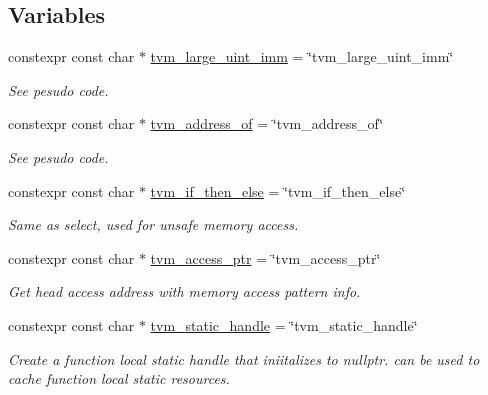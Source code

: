 \subsection*{Variables}
\begin{DoxyCompactItemize}
\item 
constexpr const char $\ast$ \hyperlink{namespacetvm_1_1tir_1_1intrinsic_abdf19f5eab40c9dbc4952e76a29bd49c}{tvm\+\_\+large\+\_\+uint\+\_\+imm} = \char`\"{}tvm\+\_\+large\+\_\+uint\+\_\+imm\char`\"{}
\begin{DoxyCompactList}\small\item\em See pesudo code. \end{DoxyCompactList}\item 
constexpr const char $\ast$ \hyperlink{namespacetvm_1_1tir_1_1intrinsic_a58cdd60cdf71a2b97109804ae5c9c78a}{tvm\+\_\+address\+\_\+of} = \char`\"{}tvm\+\_\+address\+\_\+of\char`\"{}
\begin{DoxyCompactList}\small\item\em See pesudo code. \end{DoxyCompactList}\item 
constexpr const char $\ast$ \hyperlink{namespacetvm_1_1tir_1_1intrinsic_acbd194e010059c3229f6db9809e77e5a}{tvm\+\_\+if\+\_\+then\+\_\+else} = \char`\"{}tvm\+\_\+if\+\_\+then\+\_\+else\char`\"{}
\begin{DoxyCompactList}\small\item\em Same as select, used for unsafe memory access. \end{DoxyCompactList}\item 
constexpr const char $\ast$ \hyperlink{namespacetvm_1_1tir_1_1intrinsic_a9606b4e3a5d65a1ef787969074340be1}{tvm\+\_\+access\+\_\+ptr} = \char`\"{}tvm\+\_\+access\+\_\+ptr\char`\"{}
\begin{DoxyCompactList}\small\item\em Get head access address with memory access pattern info. \end{DoxyCompactList}\item 
constexpr const char $\ast$ \hyperlink{namespacetvm_1_1tir_1_1intrinsic_a075f340d77d7e0b8b60616fe5e64d2cc}{tvm\+\_\+static\+\_\+handle} = \char`\"{}tvm\+\_\+static\+\_\+handle\char`\"{}
\begin{DoxyCompactList}\small\item\em Create a function local static handle that iniitalizes to nullptr. can be used to cache function local static resources. \end{DoxyCompactList}\item 

\end{DoxyCompactItemize}
